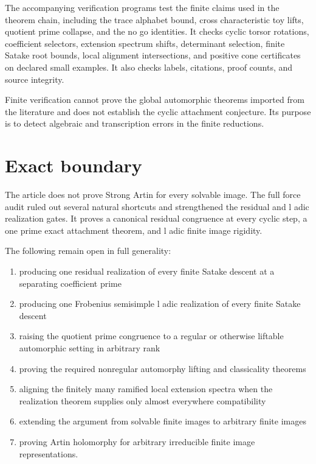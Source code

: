 \documentclass{aomart}
\theoremstyle{definition}
\theoremstyle{remark}
\begin{document}
The accompanying verification programs test the finite claims used in the theorem chain, including the trace alphabet bound, cross characteristic toy lifts, quotient prime collapse, and the no go identities. It checks cyclic torsor rotations, coefficient selectors, extension spectrum shifts, determinant selection, finite Satake root bounds, local alignment intersections, and positive cone certificates on declared small examples. It also checks labels, citations, proof counts, and source integrity.

Finite verification cannot prove the global automorphic theorems imported from the literature and does not establish the cyclic attachment conjecture. Its purpose is to detect algebraic and transcription errors in the finite reductions.

\section{Exact boundary}\label{sec:boundary}

The article does not prove Strong Artin for every solvable image. The full force audit ruled out several natural shortcuts and strengthened the residual and l adic realization gates. It proves a canonical residual congruence at every cyclic step, a one prime exact attachment theorem, and l adic finite image rigidity.

The following remain open in full generality:

\begin{enumerate}
\item producing one residual realization of every finite Satake descent at a separating coefficient prime
\item producing one Frobenius semisimple l adic realization of every finite Satake descent
\item raising the quotient prime congruence to a regular or otherwise liftable automorphic setting in arbitrary rank
\item proving the required nonregular automorphy lifting and classicality theorems
\item aligning the finitely many ramified local extension spectra when the realization theorem supplies only almost everywhere compatibility
\item extending the argument from solvable finite images to arbitrary finite images
\item proving Artin holomorphy for arbitrary irreducible finite image representations.
\end{enumerate}
\end{document}
